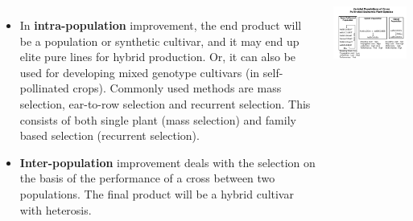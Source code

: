 \documentclass[11pt,ignorenonframetext,aspectratio=169]{beamer}
\providecommand{\tightlist}{%
  \setlength{\itemsep}{0pt}\setlength{\parskip}{0pt}}
\newcommand{\bcolumns}{\begin{columns}[T, onlytextwidth]}
\newcommand{\ecolumns}{\end{columns}}
\begin{document}
\begin{frame}{}
\protect\hypertarget{section-2}{}
\bcolumns
{}

\begin{itemize}
\tightlist
\item
  In \textbf{intra-population} improvement, the end product will be a
  population or synthetic cultivar, and it may end up elite pure lines
  for hybrid production. Or, it can also be used for developing mixed
  genotype cultivars (in self-pollinated crops). Commonly used methods
  are mass selection, ear-to-row selection and recurrent selection. This
  consists of both single plant (mass selection) and family based
  selection (recurrent selection).
\item
  \textbf{Inter-population} improvement deals with the selection on the
  basis of the performance of a cross between two populations. The final
  product will be a hybrid cultivar with heterosis.
\end{itemize}


\begin{center}\includegraphics[width=0.96\linewidth]{./images/varietal_cross_pollinated} \end{center}

\ecolumns
\end{frame}
\end{document}
